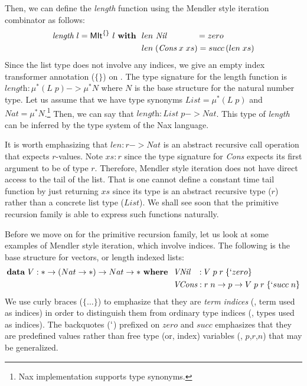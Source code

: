 Then, we can define the \textit{length} function using the Mendler style
iteration combinator as follows:
\begin{align*}
\textit{length}~l = \textsf{MIt}^{\{\}}~l~\textbf{with}~~
&  len ~\textit{Nil}~~~~~~~~~~~ = zero \\
&  len \;(\textit{Cons}\;x\;xs) = succ\,(len\;xs)
\end{align*}
Since the list type does not involve any indices, we give an empty index
transformer annotation ($\{\}$) on \MIt. The type signature for the length
function is $\textit{length}:\mu^{*}(L\;p) -> \mu^{*}N$ where $N$ is the
base structure for the natural number type. Let us assume that we have
type synonyms $\textit{List} = \mu^{*}(L\;p)$ and
$\textit{Nat} = \mu^{*}N $.\footnote{Nax implementation supports type synonyms.}
Then, we can say that $\textit{length}:\textit{List}\;p -> \textit{Nat}$.
This type of \textit{length} can be inferred by the type system of
the Nax language.

It is worth emphasizing that $len : r -> \textit{Nat}$ is an abstract recursive
call operation that expects $r$-values. Note $xs:r$ since the type signature
for \textit{Cons} expects its first argument to be of type $r$. Therefore,
Mendler style iteration does not have direct access to the tail of the list.
That is one cannot define a constant time tail function by just returning
$xs$ since its type is an abstract recursive type ($r$) rather than
a concrete list type ($List$). We shall see soon that the primitive recursion
family is able to express such functions naturally.

Before we move on for the primitive recursion family, let us look at some
examples of Mendler style iteration, which involve indices. The following
is the base structure for vectors, or length indexed lists:
\begin{align*}
\textbf{data}~V : * -> (Nat -> *) -> Nat -> * ~\textbf{where}~~
& \textit{VNil}~~\, : V\;p\;r\;\{`zero\} \\
& \textit{VCons}    : r\;n -> p -> V\;p\;r\;\{`succ\;n\}
\end{align*}
We use curly braces ($\{\dots\}$) to emphasize that they are \emph{term indices}
(\ie, term used as indices) in order to distinguish them from ordinary
type indices (\ie, types used as indices). The backquotes ($`$) prefixed
on $zero$ and $succ$ emphasizes that they are predefined values rather than
free type (or, index) variables (\eg, $p$,$r$,$n$) that may be generalized.


